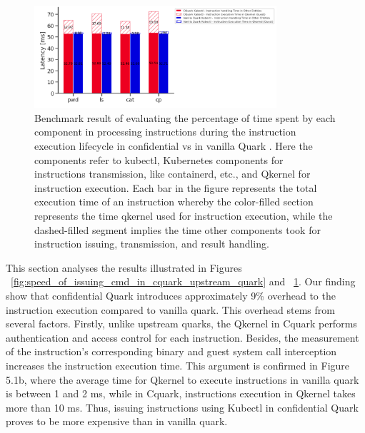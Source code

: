 \begin{figure}[H]
    \centering
    \includegraphics[width=0.8\textwidth]{images/timeshare_issuing_cmd_in_cquark_upstream_quark_kubectl.PNG}
    \caption[Benchmark result - The processing time for each component during the instruction execution lifecycle in confidential vs in vanilla Quark]{Benchmark result of evaluating the percentage of time spent by each component in processing instructions during the instruction execution lifecycle 
    in confidential vs in vanilla Quark . Here the components refer to kubectl,  Kubernetes components for instructions transmission, like containerd, etc., and Qkernel for instruction execution. 
    Each bar in the figure represents the total execution time of an instruction whereby the color-filled section represents the time qkernel used for instruction execution, while the dashed-filled segment implies the time other components took for instruction issuing, transmission, and result handling.
    }
    \label{fig:timeshare_issuing_cmd_in_cquark_upstream_quark_kubectl}
\end{figure}


This section analyses the results illustrated in Figures ~\ref{fig:speed_of_issuing_cmd_in_cquark_upstream_quark} and ~\ref{fig:timeshare_issuing_cmd_in_cquark_upstream_quark_kubectl}. Our finding show that confidential Quark introduces approximately 9\% overhead to the instruction 
execution compared to vanilla quark. This overhead stems from several factors. Firstly, unlike upstream quarks, the Qkernel in Cquark performs authentication and access control for each instruction. Besides, the measurement of the instruction's corresponding binary and guest system call 
interception increases the instruction execution time.  This argument is confirmed in Figure 5.1b, where the average time for Qkernel to execute instructions in vanilla quark is between 1 and 2 ms, while in Cquark, instructions execution in Qkernel takes more than 10 ms. Thus, issuing 
instructions using Kubectl in confidential Quark proves to be more expensive than in vanilla quark.

